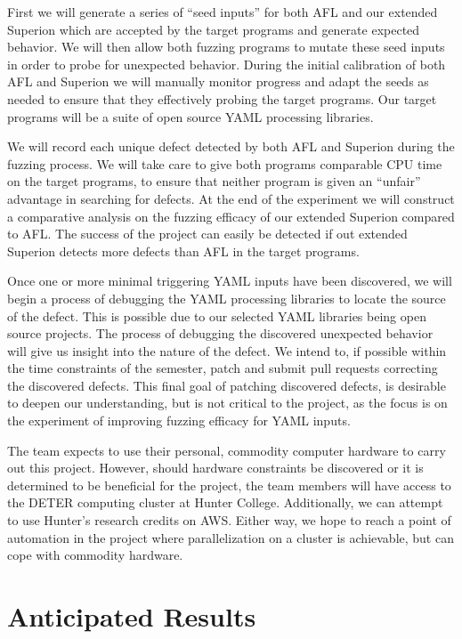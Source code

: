 \documentclass[12pt]{diazessay}
\begin{document}
First we will generate a series of ``seed inputs'' for both AFL and our extended Superion which are accepted by the target programs and generate expected behavior.
We will then allow both fuzzing programs to mutate these seed inputs\cite{Seed} in order to probe for unexpected behavior.
During the initial calibration of both AFL and Superion we will manually monitor progress and adapt the seeds as needed to ensure that they effectively probing the target programs.
Our target programs will be a suite of open source YAML processing libraries.

We will record each unique defect detected by both AFL and Superion during the fuzzing process.
We will take care to give both programs comparable CPU time on the target programs, to ensure that neither program is given an ``unfair'' advantage in searching for defects.
At the end of the experiment we will construct a comparative analysis on the fuzzing efficacy of our extended Superion compared to AFL.
The success of the project can easily be detected if out extended Superion detects more defects than AFL in the target programs.

Once one or more minimal triggering YAML inputs have been discovered, we will begin a process of debugging the YAML processing libraries to locate the source of the defect.
This is possible due to our selected YAML libraries being open source projects.
The process of debugging the discovered unexpected behavior will give us insight into the nature of the defect.
We intend to, if possible within the time constraints of the semester, patch and submit pull requests correcting the discovered defects.
This final goal of patching discovered defects, is desirable to deepen our understanding, but is not critical to the project, as the focus is on the experiment of improving fuzzing efficacy for YAML inputs.

The team expects to use their personal, commodity computer hardware to carry out this project.
However, should hardware constraints be discovered or it is determined to be beneficial for the project, the team members will have access to the DETER computing cluster at Hunter College.
Additionally, we can attempt to use Hunter's research credits on AWS.
Either way, we hope to reach a point of automation in the project where parallelization on a cluster is achievable, but can cope with commodity hardware.

\vspace{-0.25cm}
\section*{Anticipated Results}
\label{results}
\vspace{-0.25cm}
\end{document}

